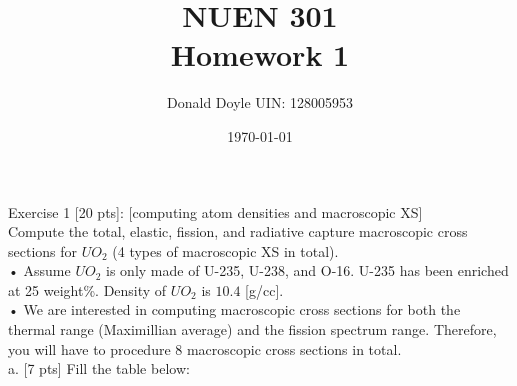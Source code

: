 \documentclass[12pt,fleqn, parskip=full]{scrartcl}
\title{NUEN 301 \\
Homework 1}
\author{Donald Doyle UIN: 128005953}
\date{\today}
\begin{document}
\maketitle


Exercise 1 [20 pts]: [computing atom densities and macroscopic XS]\\
Compute the total, elastic, fission, and radiative capture macroscopic cross sections for $UO_2$ (4 types of macroscopic XS in total).\\
• Assume $UO_2$ is only made of U-235, U-238, and O-16. U-235 has been enriched at 25 weight\%. Density of $UO_2$ is $10.4$ [g/cc].\\
• We are interested in computing macroscopic cross sections for both the thermal range (Maximillian
average) and the fission spectrum range. Therefore, you will have to procedure 8 macroscopic cross
sections in total. \\
a. [7 pts] Fill the table below: \\
\end{document}
